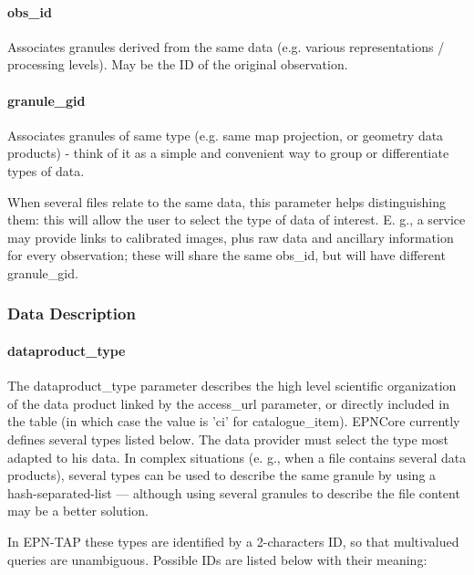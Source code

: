 \documentclass[11pt,a4paper]{ivoa}
\begin{document}
\paragraph{obs\_id}

Associates granules derived from the same data (e.g. various representations / processing levels). May be the ID of the original observation.

\paragraph{granule\_gid}

Associates granules of same type (e.g. same map projection, or geometry data products) - think of it as a simple and convenient way to group or differentiate types of data.

When several files relate to the same data, this parameter helps distinguishing them: this will allow the user to select the type of data of interest. E. g., a service may provide links to calibrated images, plus raw data and ancillary information for every observation; these will share the same obs\_id, but will have different granule\_gid.

\subsubsection{Data Description}

\paragraph{dataproduct\_type}

The dataproduct\_type parameter describes the high level scientific organization of the data product linked by the access\_url parameter, or directly included in the table (in which case the value is 'ci' for catalogue\_item). EPNCore currently defines several types listed below. The data provider must select the type most adapted to his data. In complex situations (e. g., when a file contains several data products), several types can be used to describe the same granule by using a hash-separated-list — although using several granules to describe the file content may be a better solution.  

In EPN-TAP these types are identified by a 2-characters ID, so that multivalued queries are unambiguous. Possible IDs are listed below with their meaning:
\end{document}
